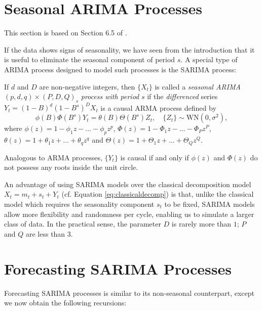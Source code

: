 \documentclass[a4paper, oneside]{discothesis}
\begin{document}
    

\section{Seasonal ARIMA Processes}
This section is based on Section 6.5 of \cite{itsf}.

If the data shows signs of seasonality, we have seen from the introduction that it is useful to eliminate the seasonal component of period $s$. A special type of ARIMA process designed to model such processes is the SARIMA process:

\begin{definition} 
    If $d$ and $D$ are non-negative integers, then $\{X_t\}$ is called a \textit{seasonal ARIMA}$(p,d,q)\times(P,D,Q)_s$ \textit{process with period} $s$ if the \textit{differenced} series \\ $Y_t = (1-B)^d (1-B^s)^D X_t$ is a causal ARMA process defined by
    \begin{equation}\label{eq:SARIMA}
        \phi(B) \Phi(B^s) Y_t = \theta(B) \Theta(B^s) Z_t, \quad \{Z_t\} \sim \mathrm{WN}(0, \sigma^2), 
    \end{equation}
    where $\phi(z) = 1 - \phi_1 z - \dots - \phi_p z^p$, $\Phi(z) = 1 - \Phi_1 z - \dots - \Phi_P z^P$, $\theta(z) = 1 + \theta_1 z + \dots + \theta_q z^q$ and $\Theta(z) = 1 + \Theta_1 z + \dots + \Theta_Q z^Q$.
\end{definition}
\begin{remark}
    Analogous to ARMA processes, $\{Y_t\}$ is causal if and only if $\phi(z)$ and $\Phi(z)$ do not possess any roots inside the unit circle. 
\end{remark}

An advantage of using SARIMA models over the classical decomposition model \\ $X_t = m_t + s_t + Y_t$ (cf. Equation \eqref{eq:classicaldecomp}) is that, unlike the classical model which requires the seasonality component $s_t$ to be fixed, SARIMA models allow more flexibility and randomness per cycle, enabling us to simulate a larger class of data. In the practical sense, the parameter $D$ is rarely more than $1$; $P$ and $Q$ are less than $3$.

\section{Forecasting SARIMA Processes}
Forecasting SARIMA processes is similar to its non-seasonal counterpart, except we now obtain the following recursions:
\end{document}
